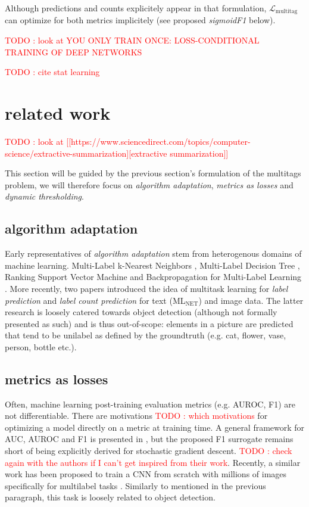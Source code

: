 \documentclass[sigconf,natbib,screen=true,review=true,anonymous]{acmart}
\newcommand\todo[1]{\textcolor{red}{TODO : #1}}
\begin{document}
Although predictions and counts explicitely appear in that formulation, \(\mathcal{L}_{\text {multitag}}\) can optimize for both metrics implicitely (see proposed \emph{sigmoidF1} below).


\todo{look at YOU ONLY TRAIN ONCE: LOSS-CONDITIONAL TRAINING OF DEEP NETWORKS}

\todo{cite stat learning}   \cite[p. 308-310]{statLearning}

\section{related work}
\label{sec:orgba5dda7}

\todo{look at [[https://www.sciencedirect.com/topics/computer-science/extractive-summarization][extractive summarization]]}

This section will be guided by the previous section's formulation of the multitags problem, we will therefore focus on \emph{algorithm adaptation}, \emph{metrics as losses} and \emph{dynamic thresholding}.

\subsection{algorithm adaptation}
\label{sec:org94e1c92}

Early representatives of \emph{algorithm adaptation} stem from heterogenous domains of machine learning. Multi-Label k-Nearest Neighbors \cite{ML-KNN}, Multi-Label Decision Tree \cite{ML-DT}, Ranking Support Vector Machine \cite{multilabelSVM} and Backpropagation for Multi-Label Learning \cite{multilabelBackprop}. More recently, two papers introduced the idea of multitask learning for \emph{label prediction} and \emph{label count prediction} for text (ML\(_{\text{NET}}\)) \cite{multitaskLabel} and image \cite{multitaskLabelImages} data. The latter research is loosely catered towards object detection (although not formally presented as such) and is thus out-of-scope: elements in a picture are predicted that tend to be unilabel as defined by the groundtruth (e.g. cat, flower, vase, person, bottle etc.).

\subsection{metrics as losses}
\label{sec:orga1c90b6}

Often, machine learning post-training evaluation metrics (e.g. AUROC, F1) are not differentiable. There are motivations \todo{which motivations} for optimizing a model directly on a metric at training time. A general framework for AUC, AUROC and F1 is presented in \cite{optimizableLosses}, but the proposed F1 surrogate remains short of being explicitly derived for stochastic gradient descent. \todo{check again with the authors if I can't get inspired from their work}. Recently, a similar work has been proposed to train a CNN from scratch with millions of images specifically for multilabel tasks \cite{tencent}. Similarly to \cite{multitaskLabelImages} mentioned in the previous paragraph, this task is loosely related to object detection.
\end{document}
